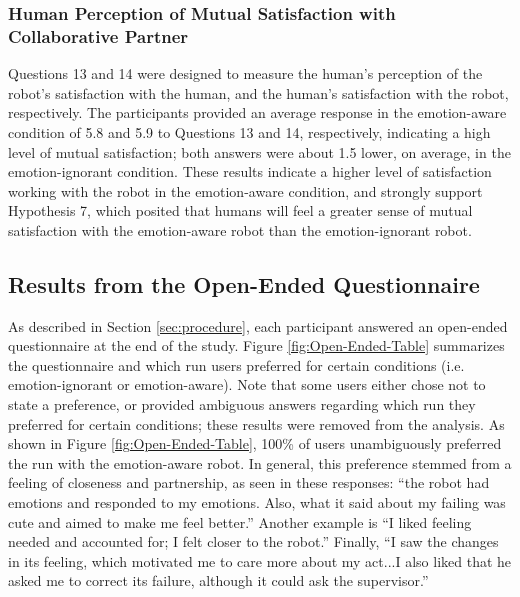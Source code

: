 \documentclass[12pt]{report}
\begin{document}
\subsubsection{Human Perception of Mutual Satisfaction with Collaborative
Partner}
\label{sec:MutualSatisfaction}
Questions 13 and 14 were designed to measure the human's perception of the
robot's satisfaction with the human, and the human's satisfaction with the
robot, respectively. The participants provided an average response in the
emotion-aware condition of 5.8 and 5.9 to Questions 13 and 14, respectively,
indicating a high level of mutual satisfaction; both answers were about 1.5
lower, on average, in the emotion-ignorant condition. These results indicate a
higher level of satisfaction working with the robot in the emotion-aware
condition, and strongly support Hypothesis 7, which posited that humans will
feel a greater sense of mutual satisfaction with the emotion-aware robot than
the emotion-ignorant robot.

\subsection{Results from the Open-Ended Questionnaire} 
\label{sec:Open-Ended}
As described in Section \ref{sec:procedure}, each participant answered an open-ended
questionnaire at the end of the study. Figure \ref{fig:Open-Ended-Table}
summarizes the questionnaire and which run users preferred for certain
conditions (i.e. emotion-ignorant or emotion-aware). Note that some users either
chose not to state a preference, or provided ambiguous answers regarding which
run they preferred for certain conditions; these results were removed from the analysis.
As shown in Figure \ref{fig:Open-Ended-Table}, 100\% of users unambiguously
preferred the run with the emotion-aware robot. In general, this preference
stemmed from a feeling of closeness and partnership, as seen in these responses:
``the robot had emotions and responded to my emotions. Also, what it said about
my failing was cute and aimed to make me feel better.'' Another example is ``I
liked feeling needed and accounted for; I felt closer to the robot.'' Finally,
``I saw the changes in its feeling, which motivated me to care more about my
act...I also liked that he asked me to correct its failure, although it could
ask the supervisor.''  
\end{document}
